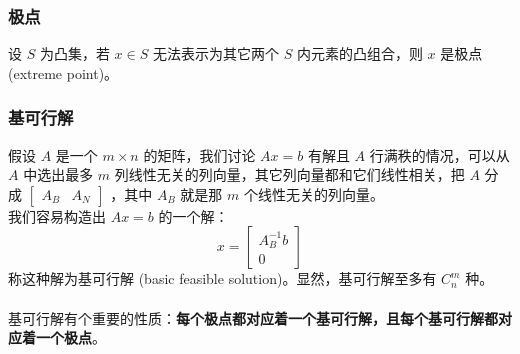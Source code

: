 \subsubsection{极点}
设 $S$ 为凸集，若 $x \in S$ 无法表示为其它两个 $S$ 内元素的凸组合，则 $x$ 是极点 (extreme point)。

\subsubsection{基可行解}
假设 $A$ 是一个 $m \times n$ 的矩阵，我们讨论 $Ax = b$ 有解且 $A$ 行满秩的情况，可以从 $A$ 中选出最多 $m$ 列线性无关的列向量，其它列向量都和它们线性相关，把 $A$ 分成 $\begin{bmatrix} A_B & A_N \end{bmatrix}$ ，其中 $A_B$ 就是那 $m$ 个线性无关的列向量。 \\
我们容易构造出 $Ax = b$ 的一个解：
$$x = \begin{bmatrix} A_B^{-1}b \\ 0 \end{bmatrix}$$ 
称这种解为基可行解 (basic feasible solution)。显然，基可行解至多有 $C_n^m$ 种。 \\~\\ 
基可行解有个重要的性质：\textbf{每个极点都对应着一个基可行解，且每个基可行解都对应着一个极点}。

\pagebreak
